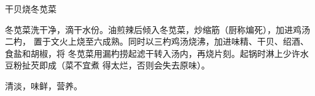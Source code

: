 %
%
%
%
%
%
%
\begin{recipe}{干贝烧冬苋菜}

\ingredients


\preparation

冬苋菜洗干净，滴干水份。油煎辣后倾入冬苋菜，炒缩筋（厨称煸死），加进鸡汤二杓，
置于文火上烧至六成熟。同时以三杓鸡汤烧沸，加进味精、干贝、绍酒、食盐和胡椒，将
冬苋菜用漏杓捞起滤干转入汤内，再烧片刻。起锅时淋上少许水豆粉扯芡即成（菜不宜煮
得太烂，否则会失去原味）。

\features

清淡，味鲜，营养。

\end{recipe}

